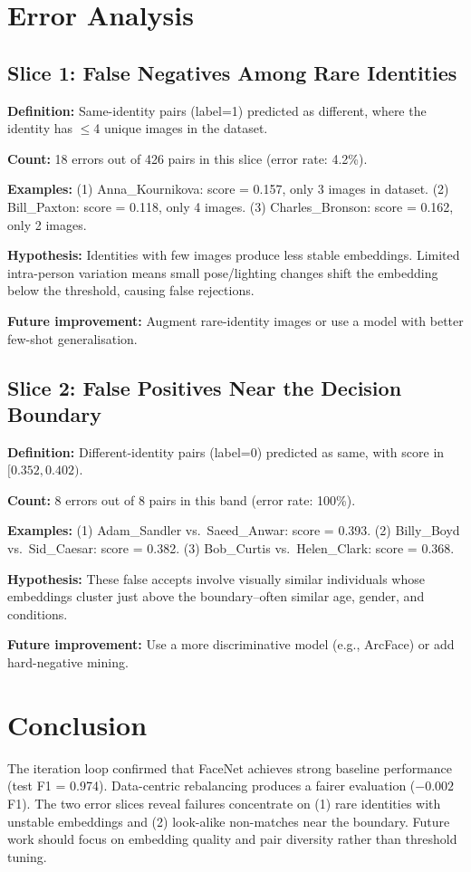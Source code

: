 \documentclass[11pt,a4paper]{article}
\begin{document}
\section{Error Analysis}

\subsection{Slice 1: False Negatives Among Rare Identities}

\textbf{Definition:} Same-identity pairs (label=1) predicted as different, where the identity has $\leq$4 unique images in the dataset.

\textbf{Count:} 18 errors out of 426 pairs in this slice (error rate: 4.2\%).

\textbf{Examples:}
(1) Anna\_Kournikova: score = 0.157, only 3 images in dataset.
(2) Bill\_Paxton: score = 0.118, only 4 images.
(3) Charles\_Bronson: score = 0.162, only 2 images.

\textbf{Hypothesis:} Identities with few images produce less stable embeddings.
Limited intra-person variation means small pose/lighting changes shift the embedding
below the threshold, causing false rejections.

\textbf{Future improvement:} Augment rare-identity images or use a model with better few-shot generalisation.

\subsection{Slice 2: False Positives Near the Decision Boundary}

\textbf{Definition:} Different-identity pairs (label=0) predicted as same, with score in $[0.352, 0.402)$.

\textbf{Count:} 8 errors out of 8 pairs in this band (error rate: 100\%).

\textbf{Examples:}
(1) Adam\_Sandler vs.\ Saeed\_Anwar: score = 0.393.
(2) Billy\_Boyd vs.\ Sid\_Caesar: score = 0.382.
(3) Bob\_Curtis vs.\ Helen\_Clark: score = 0.368.

\textbf{Hypothesis:} These false accepts involve visually similar individuals whose embeddings
cluster just above the boundary--often similar age, gender, and conditions.

\textbf{Future improvement:} Use a more discriminative model (e.g., ArcFace) or add hard-negative mining.

\section{Conclusion}

The iteration loop confirmed that FaceNet achieves strong baseline performance
(test F1 = 0.974). Data-centric rebalancing produces a fairer evaluation ($-0.002$ F1).
The two error slices reveal failures concentrate on (1) rare identities with unstable embeddings
and (2) look-alike non-matches near the boundary.
Future work should focus on embedding quality and pair diversity rather than threshold tuning.
\end{document}
